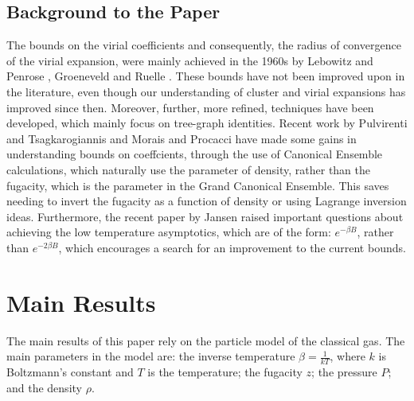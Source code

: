 \documentclass[reqno]{amsart}
\numberwithin{equation}{section}
\begin{document}
\subsection{Background to the Paper}
The bounds on the virial coefficients and consequently, the radius of convergence of the virial expansion, were mainly achieved in the 1960s by Lebowitz and Penrose \cite{LPen64}, Groeneveld \cite{G62} and Ruelle \cite{R69}. These bounds have not been improved upon in the literature, even though our understanding of cluster and virial expansions has improved since then. Moreover, further, more refined, techniques have been developed, which mainly focus on tree-graph identities. Recent work by Pulvirenti and Tsagkarogiannis \cite{PT12} and Morais and Procacci \cite{MP13} have made some gains in understanding bounds on coeffcients, through the use of Canonical Ensemble calculations, which naturally use the parameter of density, rather than the fugacity, which is the parameter in the Grand Canonical Ensemble. This saves needing to invert the fugacity as a function of density or using Lagrange inversion ideas. Furthermore, the recent paper by Jansen \cite{J12} raised important questions about achieving the low temperature asymptotics, which are of the form: $e^{-\beta B}$, rather than $e^{-2\beta B}$, which encourages a search for an improvement to the current bounds.
\section{Main Results}
The main results of this paper rely on the particle model of the classical gas. 
The main parameters in the model are: the inverse temperature $\beta = \frac{1}{kT}$, where $k$ is Boltzmann's constant and $T$ is the temperature; the fugacity $z$; the pressure $P$; and the density $\rho$.
\end{document}

